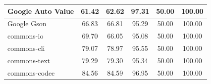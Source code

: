 \documentclass[conference,draftclsnofoot,onecolumn]{IEEEtran}
\begin{document}
\begin{table}[ht]
\begin{tabular}{|l|c|c|c|c|c|}
Google Auto Value             & 61.42                                                                                 & 62.62                                                                                     & 97.31                                                                              & 50.00                                                                               & 100.00                                                                             \\ \hline
Google Gson                   & 66.83                                                                                 & 66.81                                                                                     & 95.29                                                                              & 50.00                                                                               & 100.00                                                                             \\ \hline
commons-io                    & 69.70                                                                                 & 66.05                                                                                     & 95.08                                                                              & 50.00                                                                               & 100.00                                                                             \\ \hline
commons-cli                   & 79.07                                                                                 & 78.97                                                                                     & 95.55                                                                              & 50.00                                                                               & 100.00                                                                             \\ \hline
commons-text                  & 79.29                                                                                 & 79.30                                                                                     & 95.34                                                                              & 50.00                                                                               & 100.00                                                                             \\ \hline
commons-codec                 & 84.56                                                                                 & 84.59                                                                                     & 96.95                                                                              & 50.00                                                                               & 100.00                                                                             \\ \hline

\end{tabular}
\end{table}
\end{document}
